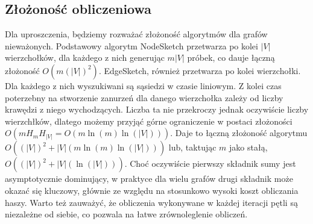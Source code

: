    \subsection{Złożoność obliczeniowa}
    Dla uproszczenia, będziemy rozważać złożoność algorytmów dla grafów nieważonych. Podstawowy algorytm NodeSketch przetwarza po kolei $|V|$ wierzchołków, dla każdego z nich generując $m|V|$ próbek, co dauje łączną złożoność $O(m(|V|)^2)$. EdgeSketch, również przetwarza po kolei wierzchołki. Dla każdego z nich wyszukiwani są sąsiedzi w czasie liniowym. Z kolei czas poterzebny na stworzenie zanurzeń dla danego wierzchołka zależy od liczby krawędzi z niego wychodzących. Liczba ta nie przekroczy jednak oczywiście liczby wierzchłków, dlatego możemy przyjąć górne ograniczenie w postaci złożoności $O(m H_m H_{|V|} = O(m \ln(m) \ln(|V|)))$. Daje to łączną złożoność algorytmu $O((|V|)^2 + |V|(m \ln(m) \ln(|V|)))$ lub, taktując $m$ jako stałą, $O((|V|)^2 + |V|(\ln(|V|)))$. Choć oczywiście pierwszy składnik sumy jest asymptotycznie dominujący, w praktyce dla wielu grafów drugi składnik może okazać się kluczowy, głównie ze względu na stosunkowo wysoki koszt obliczania haszy. Warto też zauważyć, że obliczenia wykonywane w każdej iteracji pętli są niezależne od siebie, co pozwala na łatwe zrównoleglenie obliczeń. 